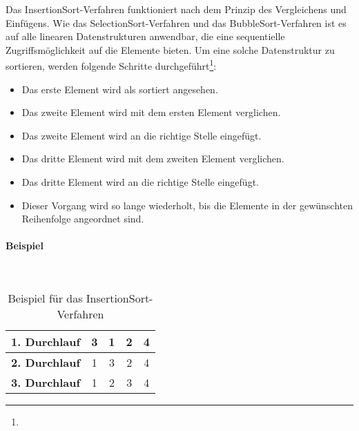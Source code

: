 \documentclass[../entry.tex]{subfiles}
\begin{document}
    Das \dq InsertionSort\dq-Verfahren funktioniert nach dem Prinzip des \dq Vergleichens und Einfügens\dq.
    Wie das \dq SelectionSort\dq-Verfahren und das \dq BubbleSort\dq-Verfahren ist es auf alle linearen Datenstrukturen anwendbar,
    die eine sequentielle Zugriffsmöglichkeit auf die Elemente bieten.
    Um eine solche Datenstruktur zu sortieren, werden folgende Schritte durchgeführt\footnote{}:
    \begin{itemize}
        \item Das erste Element wird als sortiert angesehen.
        \item Das zweite Element wird mit dem ersten Element verglichen.
        \item Das zweite Element wird an die richtige Stelle eingefügt.
        \item Das dritte Element wird mit dem zweiten Element verglichen.
        \item Das dritte Element wird an die richtige Stelle eingefügt.
        \item Dieser Vorgang wird so lange wiederholt, bis die Elemente in der gewünschten Reihenfolge angeordnet sind.
    \end{itemize}

    \paragraph{Beispiel} \mbox{}\\

    \begin{table}[h]
        \centering
        \begin{tabular}{|c|c|c|c|c|}
            \hline
            \textbf{1. Durchlauf} & 3 & {\color{red}1} & 2 & 4 \\
            \hline
            \textbf{2. Durchlauf} & 1 & 3 & {\color{red}2} & 4 \\
            \hline
            \textbf{3. Durchlauf} & 1 & 2 & 3 & 4 \\
            \hline
        \end{tabular}
        \caption{Beispiel für das \dq InsertionSort\dq-Verfahren}
        \label{tab:insertionsort}
    \end{table}
\end{document}
